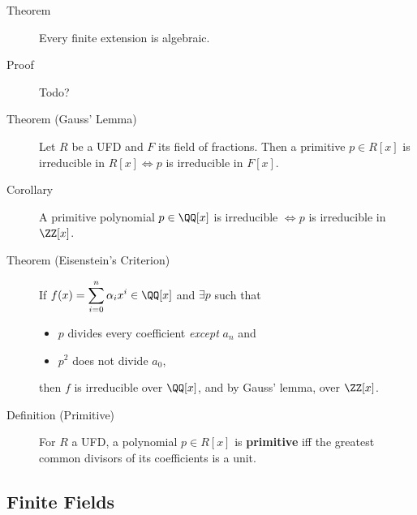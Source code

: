 \begin{description}
\item[Theorem]
Every finite extension is algebraic.
\item[Proof]
Todo?
\item[Theorem (Gauss' Lemma)]
Let \(R\) be a UFD and \(F\) its field of fractions. Then a primitive
\(p\in R[x]\) is irreducible in \(R[x] \iff p\) is irreducible in
\(F[x]\).
\item[Corollary]
A primitive polynomial \(p\in \QQ[x]\) is irreducible \(\iff p\) is
irreducible in \(\ZZ[x]\).
\item[Theorem (Eisenstein's Criterion)]
If \(f(x) = \displaystyle\sum_{i=0}^n \alpha_i x^i \in \QQ[x]\) and
\(\exists p\) such that

\begin{itemize}
\tightlist
\item
  \(p\) divides every coefficient \emph{except} \(a_n\) and
\item
  \(p^2\) does not divide \(a_0\),
\end{itemize}

then \(f\) is irreducible over \(\QQ[x]\), and by Gauss' lemma, over
\(\ZZ[x]\).
\item[Definition (Primitive)]
For \(R\) a UFD, a polynomial \(p\in R[x]\) is \textbf{primitive} iff
the greatest common divisors of its coefficients is a unit.
\end{description}

\hypertarget{finite-fields}{%
\subsection{Finite Fields}\label{finite-fields}}

